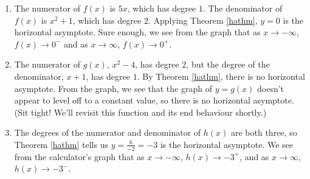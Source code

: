 {
\begin{enumerate}

\item  The numerator of $f(x)$ is $5x$, which has degree $1$.  The denominator of $f(x)$ is $x^2+1$, which has degree $2$.  Applying Theorem \ref{hathm},  $y=0$ is the horizontal asymptote.  Sure enough, we see from the graph that as $x \rightarrow - \infty$, $f(x) \rightarrow 0^{-}$ and as $x \rightarrow \infty$, $f(x) \rightarrow 0^{+}$.

\item  The numerator of $g(x)$, $x^2-4$, has degree $2$, but the degree of the denominator, $x+1$, has degree $1$.  By Theorem \ref{hathm}, there is no horizontal asymptote.  From the graph, we see that the graph of $y=g(x)$ doesn't appear to level off to a constant value, so there is no horizontal asymptote. (Sit tight!  We'll revisit this function and its end behaviour shortly.)

\item  The degrees of the numerator and denominator of $h(x)$ are both three, so Theorem \ref{hathm} tells us $y = \frac{6}{-2} = -3$ is the horizontal asymptote.  We see from the calculator's graph that as $x \rightarrow -\infty$, $h(x) \rightarrow -3^{+}$, and as $x \rightarrow \infty$, $h(x) \rightarrow -3^{-}$.


\end{enumerate}
}


